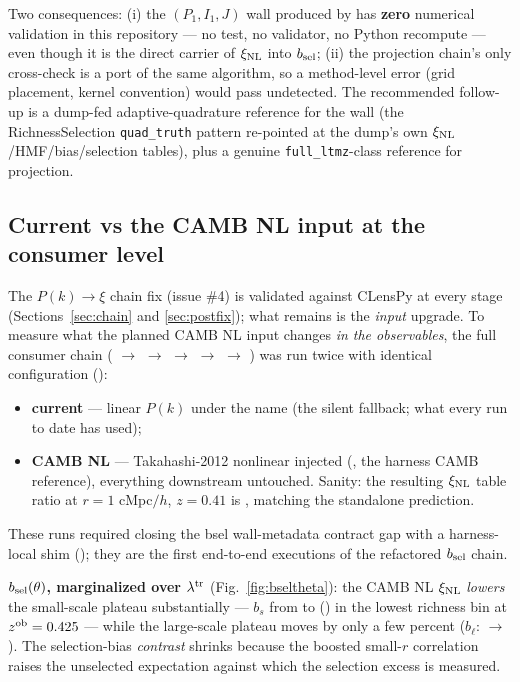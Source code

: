 Two consequences: (i) the $(P_1, I_1, J)$ wall produced by
 has \textbf{zero} numerical validation
in this repository --- no test, no validator, no Python recompute ---
even though it is the direct carrier of $\xi_{\rm NL}$ into $b_{\rm sel}$; (ii) the
projection chain's only cross-check is a port of the same algorithm,
so a method-level error (grid placement, kernel convention) would pass
undetected. The recommended follow-up is a dump-fed adaptive-quadrature
reference for the wall (the RichnessSelection \texttt{quad\_truth}
pattern re-pointed at the dump's own $\xi_{\rm NL}$/HMF/bias/selection
tables), plus a genuine \texttt{full\_ltmz}-class reference for
projection.

\subsection{Current vs the CAMB NL input at the consumer level}
\label{sec:xinl-impact}

The $P(k)\to\xi$ chain fix (issue \#4) is validated against CLensPy
at every stage (Sections~\ref{sec:chain} and \ref{sec:postfix});
what remains is the \emph{input} upgrade. To measure what the planned
CAMB NL input changes \emph{in the observables}, the
full consumer chain ( $\to$ 
$\to$  $\to$  $\to$
 $\to$ )
was run twice with identical configuration
():

\begin{itemize}
\item \textbf{current} --- linear $P(k)$ under the  name
  (the silent fallback; what every run to date has used);
\item \textbf{CAMB NL} --- Takahashi-2012 nonlinear
  injected (, the harness CAMB
  reference), everything downstream untouched. Sanity:
  the resulting $\xi_{\rm NL}$ table ratio at $r = 1$ cMpc$/h$, $z = 0.41$ is
  \xiTableNlLinAtROne{}, matching the standalone prediction.
\end{itemize}

These runs required closing the bsel wall-metadata contract gap with a
harness-local shim (); they are the
first end-to-end executions of the refactored $b_{\rm sel}$ chain.

\textbf{$b_{\rm sel}(\theta)$, marginalized over $\lambda^{\rm tr}$}
(Fig.~\ref{fig:bseltheta}): the CAMB NL $\xi_{\rm NL}$ \emph{lowers} the
small-scale plateau substantially --- $b_s$ from \bSmallCurrent{} to
\bSmallProposed{} (\bSmallShift) in the lowest richness bin at
$z^{\rm ob} = 0.425$ --- while the large-scale plateau moves by only a few
percent ($b_\ell$: \bLargeCurrent{} $\to$ \bLargeProposed). The
selection-bias \emph{contrast} shrinks because the boosted small-$r$
correlation raises the unselected expectation against which the
selection excess is measured.

